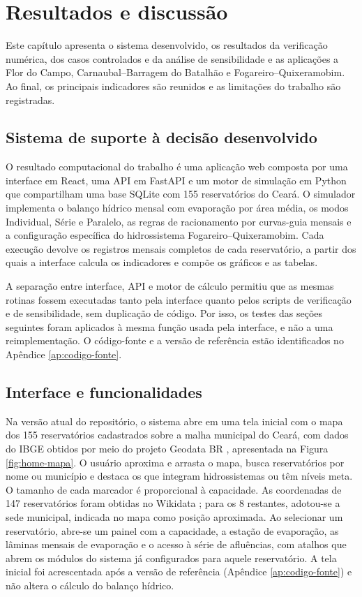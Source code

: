 \chapter{Resultados e discussão}
\label{chap:resultados}

Este capítulo apresenta o sistema desenvolvido, os resultados da verificação numérica, dos casos controlados e da análise de sensibilidade e as aplicações a Flor do Campo, Carnaubal--Barragem do Batalhão e Fogareiro--Quixeramobim. Ao final, os principais indicadores são reunidos e as limitações do trabalho são registradas.

\section{Sistema de suporte à decisão desenvolvido}
\label{sec:resultado-ssd}

O resultado computacional do trabalho é uma aplicação web composta por uma interface em React, uma API em FastAPI e um motor de simulação em Python que compartilham uma base SQLite com 155 reservatórios do Ceará. O simulador implementa o balanço hídrico mensal com evaporação por área média, os modos Individual, Série e Paralelo, as regras de racionamento por curvas-guia mensais e a configuração específica do hidrossistema Fogareiro--Quixeramobim. Cada execução devolve os registros mensais completos de cada reservatório, a partir dos quais a interface calcula os indicadores e compõe os gráficos e as tabelas.

A separação entre interface, API e motor de cálculo permitiu que as mesmas rotinas fossem executadas tanto pela interface quanto pelos scripts de verificação e de sensibilidade, sem duplicação de código. Por isso, os testes das seções seguintes foram aplicados à mesma função usada pela interface, e não a uma reimplementação. O código-fonte e a versão de referência estão identificados no Apêndice \ref{ap:codigo-fonte}.

\section{Interface e funcionalidades}
\label{sec:resultado-interface}

Na versão atual do repositório, o sistema abre em uma tela inicial com o mapa dos 155 reservatórios cadastrados sobre a malha municipal do Ceará, com dados do IBGE obtidos por meio do projeto Geodata BR \cite{geodataBr}, apresentada na Figura \ref{fig:home-mapa}. O usuário aproxima e arrasta o mapa, busca reservatórios por nome ou município e destaca os que integram hidrossistemas ou têm níveis meta. O tamanho de cada marcador é proporcional à capacidade. As coordenadas de 147 reservatórios foram obtidas no Wikidata \cite{wikidata}; para os 8 restantes, adotou-se a sede municipal, indicada no mapa como posição aproximada. Ao selecionar um reservatório, abre-se um painel com a capacidade, a estação de evaporação, as lâminas mensais de evaporação e o acesso à série de afluências, com atalhos que abrem os módulos do sistema já configurados para aquele reservatório. A tela inicial foi acrescentada após a versão de referência (Apêndice \ref{ap:codigo-fonte}) e não altera o cálculo do balanço hídrico.

